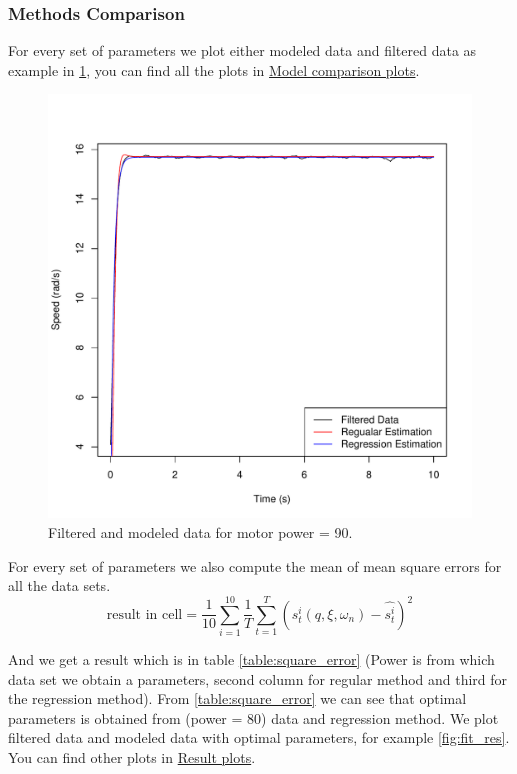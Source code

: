 \documentclass[a4paper,12pt,oneside]{article}
\begin{document}
\subsubsection {Methods Comparison}
For every set of parameters we plot either modeled data and filtered data as example in \cref{fig:fit_dual}, you can find all the plots in \href{https://github.com/AliaksandrSiarohin/AppliedRobotics/tree/master/motor_data/plots/dual_estimation}{Model comparison plots}.
\begin{figure}[h]%
	\centering
	\includegraphics[width=\columnwidth]{../motor_data/plots/dual_estimation/90}
	\caption{Filtered and modeled data for motor power = 90.}%
	\label{fig:fit_dual}%
\end{figure}
For every set of parameters we also compute the mean of mean square errors for all the data sets.
\begin{equation}
\text{result in cell} = \frac{1}{10}\sum_{i=1}^{10}\frac{1}{T}\sum_{t=1}^{T}{(s_t^i(q, \xi, \omega_{n}) - \hat{s_t^i}) ^ 2}
\end{equation}

And we get a result which is in table \cref{table:square_error} (Power is from which data set we obtain a parameters, second column for regular method and third for the regression method). From \cref{table:square_error} we can see that optimal parameters is obtained from (power = 80) data and regression method. We plot filtered data and modeled data with optimal parameters, for example \cref{fig:fit_res}. You can find other plots in \href{https://github.com/AliaksandrSiarohin/AppliedRobotics/tree/master/motor_data/plots/result_estimation}{Result plots}.
\end{document}
